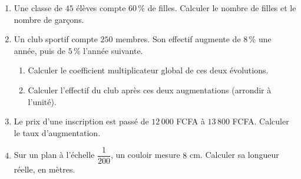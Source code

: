 \begin{enumerate}[label=\arabic*)]
\item Une classe de $45$ élèves compte $60\,\%$ de filles. Calculer le nombre de filles et
le nombre de garçons.
\item Un club sportif compte $250$ membres. Son effectif augmente de $8\,\%$ une année,
puis de $5\,\%$ l'année suivante.
\begin{enumerate}[label=\alph*)]
\item Calculer le coefficient multiplicateur global de ces deux évolutions.
\item Calculer l'effectif du club après ces deux augmentations (arrondir à l'unité).
\end{enumerate}
\item Le prix d'une inscription est passé de $12\,000$ FCFA à $13\,800$ FCFA. Calculer le
taux d'augmentation.
\item Sur un plan à l'échelle $\dfrac1{200}$, un couloir mesure $8$ cm. Calculer sa
longueur réelle, en mètres.
\end{enumerate}

